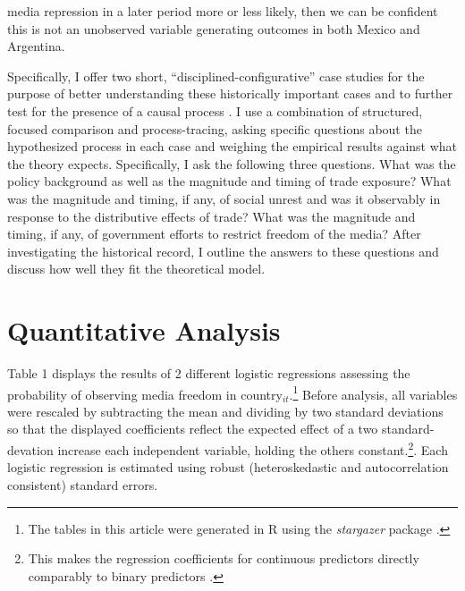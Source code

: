 \documentclass[12pt,a4paper]{article}\usepackage[]{graphicx}\usepackage[]{color}
\begin{document}
media repression in a later period more or less likely, then we can be confident this is not an unobserved variable generating outcomes in both Mexico and Argentina.

Specifically, I offer two short, “disciplined-configurative” case studies for the purpose of better understanding these historically important cases and to further test for the presence of a causal process \parencite[75]{george2005case}. I use a combination of structured, focused comparison and process-tracing, asking specific questions about the hypothesized process in each case and weighing the empirical results against what the theory expects. Specifically, I ask the following three questions. What was the policy background as well as the magnitude and timing of trade exposure? What was the magnitude and timing, if any, of social unrest and was it observably in response to the distributive effects of trade? What was the magnitude and timing, if any, of government efforts to restrict freedom of the media? After investigating the historical record, I outline the answers to these questions and discuss how well they fit the theoretical model.

\section{Quantitative Analysis}

Table 1 displays the results of 2 different logistic regressions assessing the probability of observing media freedom in country$_{it}$.\footnote{The tables in this article were generated in R using the \emph{stargazer} package \parencite{stargazerLaTeXcod:vw}.} Before analysis, all variables were rescaled by subtracting the mean and dividing by two standard deviations so that the displayed coefficients reflect the expected effect of a two standard-devation increase each independent variable, holding the others constant.\footnote{This makes the regression coefficients for continuous predictors directly comparably to binary predictors \parencite{Gelman:2008gz}.}. Each logistic regression is estimated using robust (heteroskedastic and autocorrelation consistent) standard errors.
\end{document}
